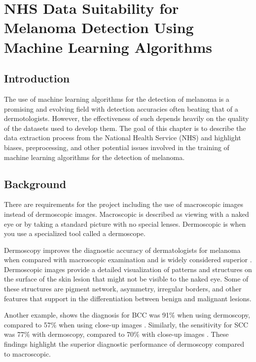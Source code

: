 \chapter{NHS Data Suitability for Melanoma Detection Using Machine Learning Algorithms}

\section{Introduction}
The use of machine learning algorithms for the detection of melanoma is a promising and evolving field with detection accuracies often beating that of a dermotologists\cite{Andre2017}. However, the effectiveness of such depends heavily on the quality of the datasets used to develop them\cite{Tae et al. (2019)}. The goal of this chapter is to describe the data extraction process from the National Health Service (NHS) and highlight biases, preprocessing, and other potential issues involved in the training of machine learning algorithms for the detection of melanoma.

\section{Background}

There are requirements for the project including the use of macroscopic images instead of dermoscopic images. Macroscopic is described as viewing with a naked eye or by taking a standard picture with no special lenses. Dermoscopic is when you use a specialized tool called a dermoscope.

Dermoscopy improves the diagnostic accuracy of dermatologists for melanoma when compared with macroscopic examination\cite{Wolner et al., 2017} and is widely considered superior \cite{Vestergaard et al., 2008}. Dermoscopic images provide a detailed visualization of patterns and structures on the surface of the skin lesion that might not be visible to the naked eye\cite{Vestergaard et al., 2008, Oliveira, R}. Some of these structures are pigment network, asymmetry, irregular borders, and other features that support in the differentiation between benign and malignant lesions\cite{Vestergaard et al., 2008}. 

Another example, shows the diagnosis for BCC was 91\% when using dermoscopy, compared to 57\% when using close-up images \cite{Dascalu et al., 2021}. Similarly, the sensitivity for SCC was 77\% with dermoscopy, compared to 70\% with close-up images \cite{Dascalu et al., 2021}. These findings highlight the superior diagnostic performance of dermoscopy compared to macroscopic.

